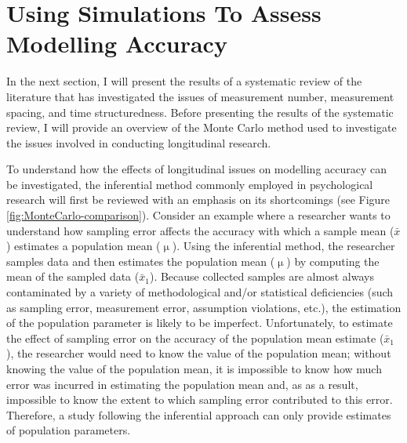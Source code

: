 \documentclass[
12pt, %
twoside,
english]{guelphthesis}
\begin{document}
\hypertarget{using-simulations-to-assess-modelling-accuracy}{%
\section{Using Simulations To Assess Modelling Accuracy}\label{using-simulations-to-assess-modelling-accuracy}}

In the next section, I will present the results of a systematic review of the literature that has investigated the issues of measurement number, measurement spacing, and time structuredness. Before presenting the results of the systematic review, I will provide an overview of the Monte Carlo method used to investigate the issues involved in conducting longitudinal research.

To understand how the effects of longitudinal issues on modelling accuracy can be investigated, the inferential method commonly employed in psychological research will first be reviewed with an emphasis on its shortcomings (see Figure \ref{fig:MonteCarlo-comparison}). Consider an example where a researcher wants to understand how sampling error affects the accuracy with which a sample mean (\(\bar{x}\)) estimates a population mean (\(\upmu\)). Using the inferential method, the researcher samples data and then estimates the population mean (\(\upmu\)) by computing the mean of the sampled data (\(\bar{x}_1\)). Because collected samples are almost always contaminated by a variety of methodological and/or statistical deficiencies (such as sampling error, measurement error, assumption violations, etc.), the estimation of the population parameter is likely to be imperfect. Unfortunately, to estimate the effect of sampling error on the accuracy of the population mean estimate (\(\bar{x}_1\)), the researcher would need to know the value of the population mean; without knowing the value of the population mean, it is impossible to know how much error was incurred in estimating the population mean and, as as a result, impossible to know the extent to which sampling error contributed to this error. Therefore, a study following the inferential approach can only provide estimates of population parameters.
\end{document}
